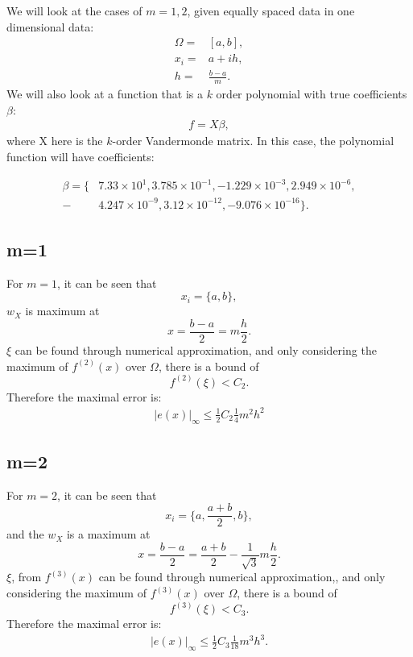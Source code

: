 \documentclass[12pt]{article}{}
\begin{document}
We will look at the cases of $m=1,2$, given equally spaced data in one dimensional data:
\begin{align}
	\Omega =& [a,b],\\
	x_i =& a + ih, \\
	h =& \frac{b-a}{m}.
\end{align}
We will also look at a function that is a $k$ order polynomial with true coefficients $\beta$:
\begin{align}
	f = X\beta,
\end{align}
where X here is the $k$-order Vandermonde matrix. In this case, the polynomial function will have coefficients:

\begin{align}
	\beta = \{&7.33\times 10^{1}, 3.785 \times 10^{-1},  -1.229\times 10^{-3},2.949\times 10^{-6},\\-&4.247\times 10^{-9},3.12\times 10^{-12},-9.076\times 10^{-16}\}. 
\end{align}

\subsection{m=1}
For $m=1$, it can be seen that $$x_i = \{a,b\},$$ $w_X$ is maximum at $$x = \frac{b-a}{2} = m\frac{h}{2}.$$ $\xi$ can be found through numerical approximation, and only considering the maximum of $f^{(2)}(x)$ over $\Omega$, there is a bound of $$ f^{(2)}(\xi) < C_2.$$ Therefore the maximal error is:
\begin{align}
	|e(x)|_{\infty} \leq \frac{1}{2}C_2\frac{1}{4}m^2h^2
\end{align}

\subsection{m=2}
For $m=2$, it can be seen that $$x_i = \{a,\frac{a+b}{2},b\},$$ and the $w_X$ is a maximum at $$x = \frac{b-a}{2} = \frac{a+b}{2} - \frac{1}{\sqrt{3}}m\frac{h}{2}.$$ $\xi$, from $f^{(3)}(x)$ can be found through numerical approximation,, and only considering the maximum of $f^{(3)}(x)$ over $\Omega$, there is a bound of $$ f^{(3)}(\xi) < C_3.$$ Therefore the maximal error is:
\begin{align}
	|e(x)|_{\infty} \leq \frac{1}{2}C_3\frac{1}{18}m^3h^3.
\end{align}
\end{document}
